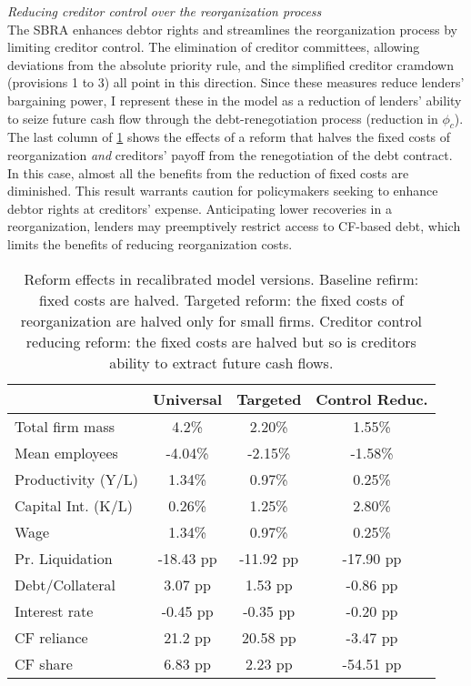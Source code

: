\documentclass[12pt]{article}
\begin{document}
\textit{Reducing creditor control over the reorganization process} \\
The SBRA enhances debtor rights and streamlines the reorganization process by limiting creditor control. The elimination of creditor committees, allowing deviations from the absolute priority rule, and the simplified creditor cramdown (provisions 1 to 3) all point in this direction. Since these measures reduce lenders' bargaining power, I represent these in the model as a reduction of lenders' ability to seize future cash flow through the debt-renegotiation process (reduction in $\phi_c$). The last column of \ref{tab:percentage_changes2} shows the effects of a reform that halves the fixed costs of reorganization \textit{and} creditors' payoff from the renegotiation of the debt contract. In this case, almost all the benefits from the reduction of fixed costs are diminished. This result warrants caution for policymakers seeking to enhance debtor rights at creditors' expense. Anticipating lower recoveries in a reorganization, lenders may preemptively restrict access to CF-based debt, which limits the benefits of reducing reorganization costs. 

\begin{table}[H]
    \centering
    \begin{tabular}{lccc}
     & \textbf{Universal} & \textbf{Targeted} & \textbf{Control Reduc.} \\    
    \toprule
    Total firm mass & 4.2\%  & 2.20\% & 1.55\%  \\  
    Mean employees & -4.04\%  & -2.15\% & -1.58\%   \\  
    Productivity (Y/L) & 1.34\%  & 0.97\% & 0.25\%  \\  
    Capital Int. (K/L) & 0.26\%  & 1.25\% & 2.80\%  \\  
    Wage & 1.34\%  & 0.97\% & 0.25\%  \vspace{2mm}  \\  
    Pr. Liquidation & -18.43 pp  & -11.92 pp & -17.90 pp \\  
    Debt/Collateral & 3.07 pp  &  1.53 pp & -0.86 pp  \\  
    Interest rate & -0.45 pp  & -0.35 pp & -0.20 pp  \\  
    CF reliance & 21.2 pp  & 20.58 pp & -3.47 pp  \\    
    CF share & 6.83 pp  & 2.23 pp & -54.51 pp  \\  
    \bottomrule
    \end{tabular}
    \caption{\small Reform effects in recalibrated model versions. Baseline refirm: fixed costs are halved. Targeted reform: the fixed costs of reorganization are halved only for small firms. Creditor control reducing reform: the fixed costs are halved but so is creditors ability to extract future cash flows.}
    \label{tab:percentage_changes2}
\end{table}
\end{document}
